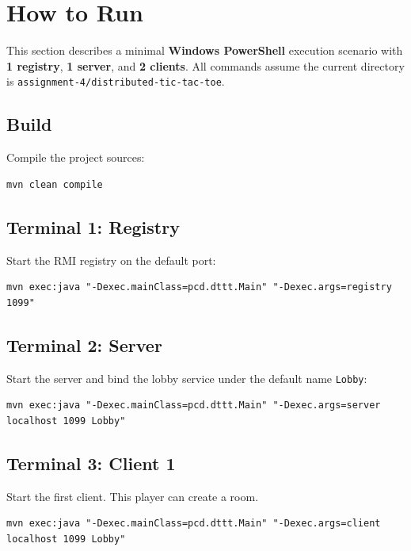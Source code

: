 \clearpage
\section{How to Run}

This section describes a minimal \textbf{Windows PowerShell} execution
scenario with \textbf{1 registry}, \textbf{1 server}, and \textbf{2 clients}.
All commands assume the current directory is
\texttt{assignment-4/distributed-tic-tac-toe}.

\subsection{Build}

Compile the project sources:

\begin{lstlisting}[style=codestyle]
mvn clean compile
\end{lstlisting}

\subsection{Terminal 1: Registry}

Start the RMI registry on the default port:

\begin{lstlisting}[style=codestyle]
mvn exec:java "-Dexec.mainClass=pcd.dttt.Main" "-Dexec.args=registry 1099"
\end{lstlisting}

\subsection{Terminal 2: Server}

Start the server and bind the lobby service under the default name
\texttt{Lobby}:

\begin{lstlisting}[style=codestyle]
mvn exec:java "-Dexec.mainClass=pcd.dttt.Main" "-Dexec.args=server localhost 1099 Lobby"
\end{lstlisting}

\subsection{Terminal 3: Client 1}

Start the first client. This player can create a room.

\begin{lstlisting}[style=codestyle]
mvn exec:java "-Dexec.mainClass=pcd.dttt.Main" "-Dexec.args=client localhost 1099 Lobby"
\end{lstlisting}

